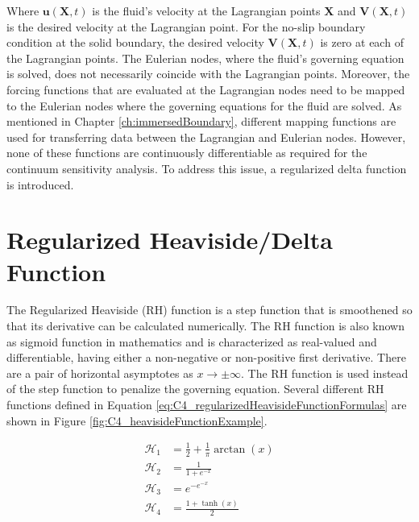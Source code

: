 Where $\mathbf{u}(\mathbf{X}, t)$ is the fluid's velocity at the Lagrangian points $\mathbf{X}$ and $\mathbf{V}(\mathbf{X}, t)$ is the desired velocity at the Lagrangian point. For the no-slip boundary condition at the solid boundary, the desired velocity $\mathbf{V}(\mathbf{X}, t)$ is zero at each of the Lagrangian points. The Eulerian nodes, where the fluid's governing equation is solved, does not necessarily coincide with the Lagrangian points. Moreover, the forcing functions that are evaluated at the Lagrangian nodes need to be mapped to the Eulerian nodes where the governing equations for the fluid are solved. As mentioned in Chapter \ref{ch:immersedBoundary}, different mapping functions are used for transferring data between the Lagrangian and Eulerian nodes. However, none of these functions are continuously differentiable as required for the continuum sensitivity analysis. To address this issue, a regularized delta function is introduced.

\section{Regularized Heaviside/Delta Function}\label{sec:C4_RHandRDfunction}
The Regularized Heaviside (RH) function is a step function that is smoothened so that its derivative can be calculated numerically. The RH function is also known as sigmoid function in mathematics and is characterized as real-valued and differentiable, having either a non-negative or non-positive first derivative. There are a pair of horizontal asymptotes as $x \rightarrow \pm \infty$. The RH function is used instead of the step function to penalize the governing equation.  Several different RH functions defined in Equation \eqref{eq:C4_regularizedHeavisideFunctionFormulas} are shown in Figure \ref{fig:C4_heavisideFunctionExample}.

\begin{subequations}\label{eq:C4_regularizedHeavisideFunctionFormulas}
\begin{align}
    \mathcal{H}_1 &= \frac{1}{2} + \frac{1}{\pi} \arctan \left( x \right) \\
    \mathcal{H}_2 &= \frac{1}{1 + e^{-x}} \\
    \mathcal{H}_3 &= e^{-e^{-x}} \\
    \mathcal{H}_4 &= \frac{1 + \tanh(x)}{2}
\end{align}
\end{subequations}

